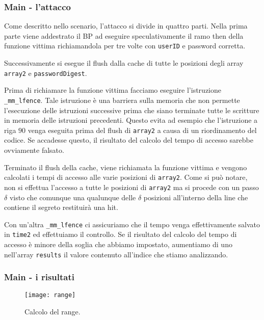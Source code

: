 				\subsubsection{Main - l'attacco}
				
				Come descritto nello scenario, l'attacco si divide in quattro parti. Nella prima parte viene addestrato il \ac{BP} ad eseguire speculativamente il ramo then della funzione vittima richiamandola per tre volte con \texttt{userID} e password corretta.
				
				Successivamente si esegue il flush dalla cache di tutte le posizioni degli array \texttt{array2} e \texttt{passwordDigest}.
				
				Prima di richiamare la funzione vittima facciamo eseguire l'istruzione \texttt{\_mm\_lfence}. Tale istruzione è una barriera sulla memoria che non permette l'esecuzione delle istruzioni successive prima che siano terminate tutte le scritture in memoria delle istruzioni precedenti. Questo evita ad esempio che l'istruzione a riga $90$ venga eseguita prima del flush di \texttt{array2} a causa di un riordinamento del codice. Se accadesse questo, il risultato del calcolo del tempo di accesso sarebbe ovviamente falsato.
				
				Terminato il flush della cache, viene richiamata la funzione vittima e vengono calcolati i tempi di accesso alle varie posizioni di \texttt{array2}. Come si può notare, non si effettua l'accesso a tutte le posizioni di \texttt{array2} ma si procede con un passo $\delta$ visto che comunque una qualunque delle $\delta$ posizioni all'interno della line che contiene il segreto restituirà una hit.
				
				Con un'altra \texttt{\_mm\_lfence} ci assicuriamo che il tempo venga effettivamente salvato in \texttt{time2} ed effettuiamo il controllo. Se il risultato del calcolo del tempo di accesso è minore della soglia che abbiamo impostato, aumentiamo di uno nell'array \texttt{results} il valore  contenuto all'indice che stiamo analizzando.
				
				\subsubsection{Main - i risultati}
				
				\begin{figure}[b]
					\begin{center}
						\texttt{[image: range]}
						\caption[Schermata di SPARK]{Calcolo del range.}
						\label{fig:range}
					\end{center}
				\end{figure}
				
